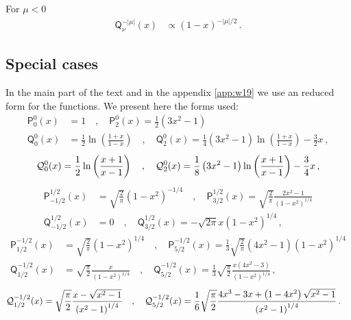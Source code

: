 \documentclass[aps,10pt,prd,groupedaddress,nofootinbib,notitlepage,eqsecnum,preprintnumbers]{revtex4-1}
\begin{document}
For $\mu<0$
\begin{align}
\mathsf{Q}_{\nu}^{-|\mu|}(x)&\propto (1-x)^{-|\mu|/2}\,.
\end{align}



\subsection{Special cases}
In the main part of the text and in the appendix \ref{app:w19} we use an reduced form for the functions. We present here the forms used:
\begin{align}
\mathsf{P}_0^0(x)&=1\quad,\quad \mathsf{P}_2^0(x)=\frac{1}{2}\left(3x^2-1\right)\\
\mathsf{Q}_0^0(x)&=\frac{1}{2}\ln\left(\frac{1+x}{1-x}\right)\quad,\quad \mathsf{Q}_2^0(x)=\frac{1}{4}\left(3x^2-1\right)\ln\left(\frac{1+x}{1-x}\right)-\frac{3}{2}x\,,
\end{align}
\begin{align}
{\cal Q}_0^0(x)=\frac{1}{2}\ln\left(\frac{x+1}{x-1}\right)\quad,\quad {\cal Q}_2^0(x)=\frac{1}{8}\left(3x^2-1\right)\ln\left(\frac{x+1}{x-1}\right)-\frac{3}{4}x\,,
\end{align}
\begin{align}
\mathsf{P}^{1/2}_{-1/2}(x)&=\sqrt{\frac{2}{\pi}}\left(1-x^2\right)^{-1/4}\quad,\quad \mathsf{P}_{3/2}^{1/2}(x)=\sqrt{\frac{2}{\pi}}\frac{2x^2-1}{\left(1-x^2\right)^{1/4}}\\
\mathsf{Q}^{1/2}_{-1/2}(x)&=0\quad,\quad \mathsf{Q}_{3/2}^{1/2}(x)=-\sqrt{2\pi}x\left(1-x^2\right)^{1/4}\,,
\end{align}
\begin{align}
\mathsf{P}^{-1/2}_{1/2}(x)&=\sqrt{\frac{2}{\pi}}\left(1-x^2\right)^{1/4}\quad,\quad \mathsf{P}_{5/2}^{-1/2}(x)=\frac{1}{3}\sqrt{\frac{2}{\pi}}{\left(4x^2-1\right)}{\left(1-x^2\right)^{1/4}}\\
\mathsf{Q}^{-1/2}_{1/2}(x)&=\sqrt{\frac{\pi}{2}}\frac{x}{\left(1-x^2\right)^{1/4}}\quad,\quad \mathsf{Q}_{5/2}^{-1/2}(x)=\frac{1}{3}\sqrt{\frac{\pi}{2}}\frac{x\left(4x^2-3\right)}{\left(1-x^2\right)^{1/4}}\,,
\end{align}
\begin{align}
{\cal Q}^{-1/2}_{1/2}(x)&=\sqrt{\frac{\pi}{2}}\frac{x-\sqrt{x^2-1}}{\left(x^2-1\right)^{1/4}}\quad,\quad {\cal Q}_{5/2}^{-1/2}(x)=\frac{1}{6}\sqrt{\frac{\pi}{2}}\frac{4x^3-3x+\left(1-4x^2\right)\sqrt{x^2-1}}{\left(x^2-1\right)^{1/4}}\,.
\end{align}


 
\end{document}
